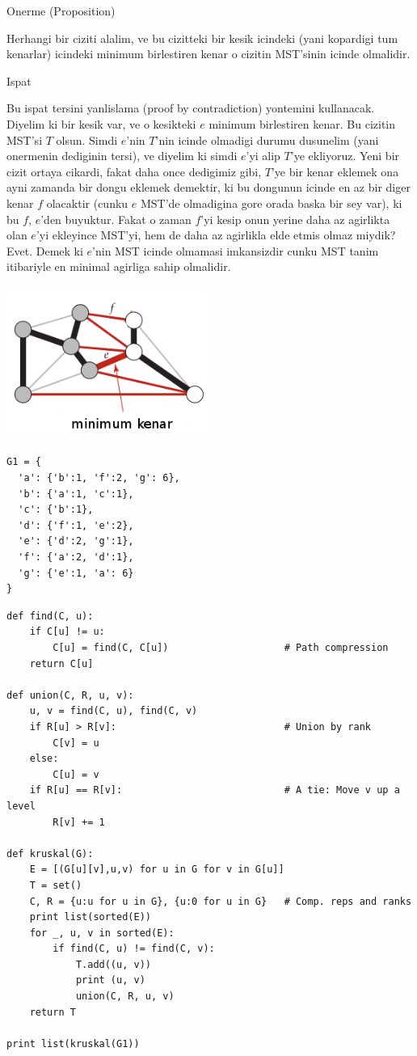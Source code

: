 \documentclass[12pt,fleqn]{article}\usepackage{../common}
\begin{document}
Onerme (Proposition)

Herhangi bir ciziti alalim, ve bu cizitteki bir kesik icindeki (yani
kopardigi tum kenarlar) icindeki minimum birlestiren kenar o cizitin MST'sinin
icinde olmalidir. 

Ispat

Bu ispat tersini yanlislama (proof by contradiction) yontemini
kullanacak. Diyelim ki bir kesik var, ve o kesikteki $e$ minimum
birlestiren kenar. Bu cizitin MST'si $T$ olsun. Simdi $e$'nin $T$'nin
icinde olmadigi durumu dusunelim (yani onermenin dediginin tersi), ve
diyelim ki simdi $e$'yi alip $T$'ye ekliyoruz. Yeni bir cizit ortaya
cikardi, fakat daha once dedigimiz gibi, $T$'ye bir kenar eklemek ona ayni
zamanda bir dongu eklemek demektir, ki bu dongunun icinde en az bir diger
kenar $f$ olacaktir (cunku $e$ MST'de olmadigina gore orada baska bir sey
var), ki bu $f$, $e$'den buyuktur. Fakat o zaman $f$'yi kesip onun yerine
daha az agirlikta olan $e$'yi ekleyince MST'yi, hem de daha az agirlikla
elde etmis olmaz miydik? Evet. Demek ki $e$'nin MST icinde olmamasi
imkansizdir cunku MST tanim itibariyle en minimal agirliga sahip olmalidir.

\includegraphics[height=5cm]{cross_edge.png}


\begin{verbatim}
G1 = {
  'a': {'b':1, 'f':2, 'g': 6},
  'b': {'a':1, 'c':1},
  'c': {'b':1},
  'd': {'f':1, 'e':2},
  'e': {'d':2, 'g':1},
  'f': {'a':2, 'd':1},
  'g': {'e':1, 'a': 6}
}
\end{verbatim}


\begin{verbatim}
def find(C, u):
    if C[u] != u:
        C[u] = find(C, C[u])                    # Path compression
    return C[u]

def union(C, R, u, v):
    u, v = find(C, u), find(C, v)
    if R[u] > R[v]:                             # Union by rank
        C[v] = u
    else:
        C[u] = v
    if R[u] == R[v]:                            # A tie: Move v up a level
        R[v] += 1

def kruskal(G):
    E = [(G[u][v],u,v) for u in G for v in G[u]]
    T = set()
    C, R = {u:u for u in G}, {u:0 for u in G}   # Comp. reps and ranks
    print list(sorted(E))
    for _, u, v in sorted(E):
        if find(C, u) != find(C, v):
            T.add((u, v))
            print (u, v)
            union(C, R, u, v)
    return T

print list(kruskal(G1))
\end{verbatim}
\end{document}
